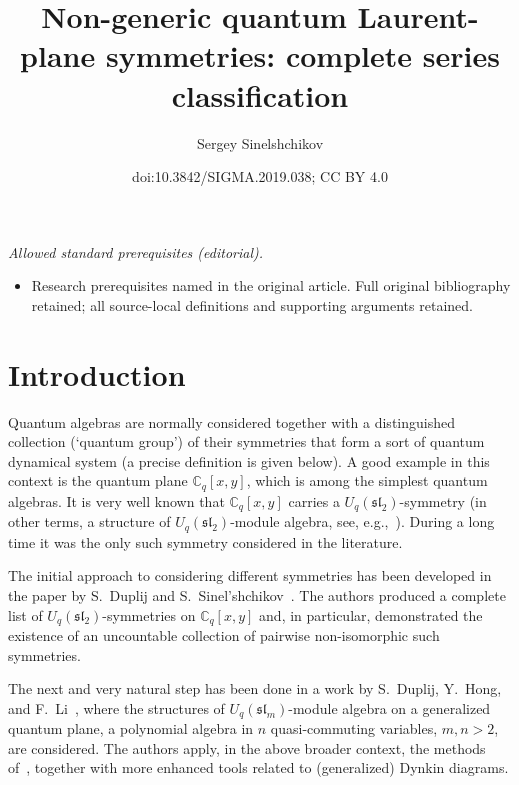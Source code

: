 \documentclass[10pt,a4paper]{amsart}
\title{Non-generic quantum Laurent-plane symmetries: complete series classification}
\author{Sergey Sinelshchikov}
\date{doi:10.3842/SIGMA.2019.038; CC BY 4.0}
\numberwithin{equation}{section}
\begin{document}
\maketitle
\noindent\textit{Allowed standard prerequisites (editorial).}\begin{itemize}
\item Research prerequisites named in the original article. Full original bibliography retained; all source-local definitions and supporting arguments retained.
\end{itemize}\medskip
\section{Introduction}

Quantum algebras are normally considered together with a distinguished collection (`quantum group') of their symmetries that form a sort of quantum dynamical system (a precise definition is given below). A good example in this context is the quantum plane $\mathbb{C}_q[x,y]$, which is among the simplest quantum algebras. It is very well known that $\mathbb{C}_q[x,y]$ carries a $U_q(\mathfrak{sl}_2)$-symmetry (in other terms, a structure of $U_q(\mathfrak{sl}_2)$-module algebra, see, e.g.,~\cite{C}). During a long time it was the only such symmetry considered in the literature.

The initial approach to considering different symmetries has been developed in the paper by S.~Duplij and S.~Sinel'shchikov~\cite{DS}. The authors produced a complete list of $U_q(\mathfrak{sl}_2)$-symmetries on $\mathbb{C}_q[x,y]$ and, in particular, demonstrated the existence of an uncountable collection of pairwise non-isomorphic such symmetries.

The next and very natural step has been done in a work by S.~Duplij, Y.~Hong, and F.~Li~\cite{DHL}, where the structures of $U_q(\mathfrak{sl}_m)$-module algebra on a generalized quantum plane, a polynomial algebra in $n$
quasi-commuting variables, $m,n>2$, are considered. The authors apply, in the above broader context, the methods of~\cite{DS}, together with more enhanced tools related to (ge\-ne\-ralized) Dynkin diagrams.
\end{document}

